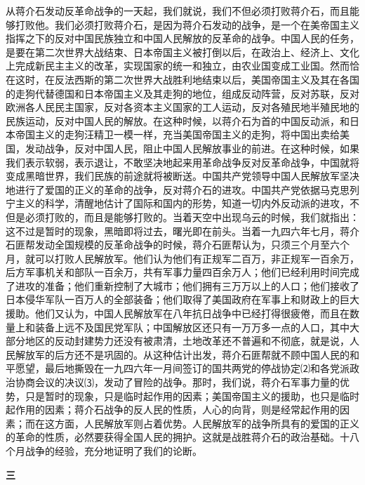 \documentclass[UTF-8, a5paper, 12pt]{ctexart}
\begin{document}
从蒋介石发动反革命战争的一天起，我们就说，我们不但必须打败蒋介石，而且能够打败他。我们必须打败蒋介石，是因为蒋介石发动的战争，是一个在美帝国主义指挥之下的反对中国民族独立和中国人民解放的反革命的战争。中国人民的任务，是要在第二次世界大战结束、日本帝国主义被打倒以后，在政治上、经济上、文化上完成新民主主义的改革，实现国家的统一和独立，由农业国变成工业国。然而恰在这时，在反法西斯的第二次世界大战胜利地结束以后，美国帝国主义及其在各国的走狗代替德国和日本帝国主义及其走狗的地位，组成反动阵营，反对苏联，反对欧洲各人民民主国家，反对各资本主义国家的工人运动，反对各殖民地半殖民地的民族运动，反对中国人民的解放。在这种时候，以蒋介石为首的中国反动派，和日本帝国主义的走狗汪精卫一模一样，充当美国帝国主义的走狗，将中国出卖给美国，发动战争，反对中国人民，阻止中国人民解放事业的前进。在这种时候，如果我们表示软弱，表示退让，不敢坚决地起来用革命战争反对反革命战争，中国就将变成黑暗世界，我们民族的前途就将被断送。中国共产党领导中国人民解放军坚决地进行了爱国的正义的革命的战争，反对蒋介石的进攻。中国共产党依据马克思列宁主义的科学，清醒地估计了国际和国内的形势，知道一切内外反动派的进攻，不但是必须打败的，而且是能够打败的。当着天空中出现乌云的时候，我们就指出：这不过是暂时的现象，黑暗即将过去，曙光即在前头。当着一九四六年七月，蒋介石匪帮发动全国规模的反革命战争的时候，蒋介石匪帮认为，只须三个月至六个月，就可以打败人民解放军。他们认为他们有正规军二百万，非正规军一百余万，后方军事机关和部队一百余万，共有军事力量四百余万人；他们已经利用时间完成了进攻的准备；他们重新控制了大城市；他们拥有三万万以上的人口；他们接收了日本侵华军队一百万人的全部装备；他们取得了美国政府在军事上和财政上的巨大援助。他们又认为，中国人民解放军在八年抗日战争中已经打得很疲倦，而且在数量上和装备上远不及国民党军队；中国解放区还只有一万万多一点的人口，其中大部分地区的反动封建势力还没有被肃清，土地改革还不普遍和不彻底，就是说，人民解放军的后方还不是巩固的。从这种估计出发，蒋介石匪帮就不顾中国人民的和平愿望，最后地撕毁在一九四六年一月间签订的国共两党的停战协定⑵和各党派政治协商会议的决议⑶，发动了冒险的战争。那时，我们说，蒋介石军事力量的优势，只是暂时的现象，只是临时起作用的因素；美国帝国主义的援助，也只是临时起作用的因素；蒋介石战争的反人民的性质，人心的向背，则是经常起作用的因素；而在这方面，人民解放军则占着优势。人民解放军的战争所具有的爱国的正义的革命的性质，必然要获得全国人民的拥护。这就是战胜蒋介石的政治基础。十八个月战争的经验，充分地证明了我们的论断。

\textbf{三}
\end{document}
